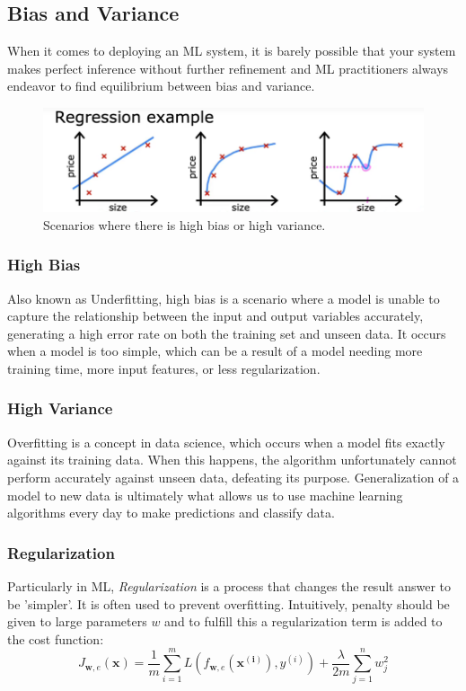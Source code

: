 \documentclass[12pt, twoside]{article}
\begin{document}
\begin{multicols*}{2}
	\subsection{Bias and Variance}
	When it comes to deploying an ML system, it is barely possible that your system makes perfect inference without further refinement and ML practitioners always endeavor to find equilibrium between bias and variance.
	\begin{figure}[H]
		\centering
		\includegraphics[width=\columnwidth]{bias-variance-eg}
		\caption{Scenarios where there is high bias or high variance.}
		\label{fig:bias-variance}
	\end{figure}
		\subsubsection{High Bias}
		Also known as Underfitting, high bias is a scenario where a model is unable to capture the relationship between the input and output variables accurately, generating a high error rate on both the training set and unseen data. It occurs when a model is too simple, which can be a result of a model needing more training time, more input features, or less regularization. 
		
		\subsubsection{High Variance}
		Overfitting is a concept in data science, which occurs when a model fits exactly against its training data. When this happens, the algorithm unfortunately cannot perform accurately against unseen data, defeating its purpose. Generalization of a model to new data is ultimately what allows us to use machine learning algorithms every day to make predictions and classify data.
		
		\subsubsection{Regularization}
		Particularly in ML, \textit{Regularization} is a process that changes the result answer to be 'simpler'\cite{regularization}. It is often used to prevent overfitting. Intuitively, penalty should be given to large parameters $w$ and to fulfill this a regularization term is added to the cost function:
		$$ J_{\mathbf{w},e}(\mathbf{x})=\frac{1}{m}\sum_{i=1}^{m}L(f_{\mathbf{w},e}(\mathbf{x^{(i)}}),y^{(i)})+\frac{\lambda}{2m}\sum_{j=1}^{n}w_j^2 $$
		

\end{multicols*}
\end{document}
